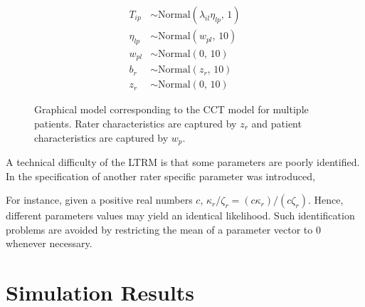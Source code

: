 \documentclass{article}
\newcommand{\Irater}{r}
\newcommand{\Iitem}{i}
\newcommand{\Ipatient}{p}
\newcommand{\Incat}{c}
\newcommand{\Ilatent}{l}
\newcommand{\Tncat}{\expandafter\MakeUppercase\expandafter{\Incat}}
\newcommand{\logit}[1]{\text{logit}\left(#1\right)}
\newcommand{\dnorm}[2]{\text{Normal}\left(#1,\,#2\right)}
\begin{document}
\begin{figure}[!ht]
\begin{minipage}{0.5\textwidth}
{\begin{align*}
	T_{\Iitem\Ipatient} &\sim \dnorm{\lambda_{\Iitem\Ilatent}\eta_{\Ilatent\Ipatient}}{1}\\
	\eta_{\Ilatent\Ipatient} &\sim \dnorm{w_{\Ipatient\Ilatent}}{10} \\
	w_{\Ipatient\Ilatent} & \sim\dnorm{0}{10} \\
	b_\Irater   &\sim \dnorm{z_\Irater}{10}\\
	z_\Irater &\sim \dnorm{0}{10}
	\end{align*}
}%
\end{minipage}
	\caption{Graphical model corresponding to the CCT model for multiple patients. Rater characteristics are captured by $z_\Irater$ and patient characteristics are captured by $w_\Ipatient$.}
	\label{model:LTRM3}
\end{figure}

A technical difficulty of the LTRM is that some parameters are poorly identified. In the specification of \cite{Anders2015cultural} another rater specific parameter was introduced, 

For instance, given a positive real numbers $c$, $\kappa_\Irater / \zeta_\Irater = (c\kappa_\Irater) / (c\zeta_\Irater)$. Hence, different parameters values may yield an identical likelihood. Such identification problems are avoided by restricting the mean of a parameter vector to 0 whenever necessary.



\section*{Simulation Results}
\end{document}
